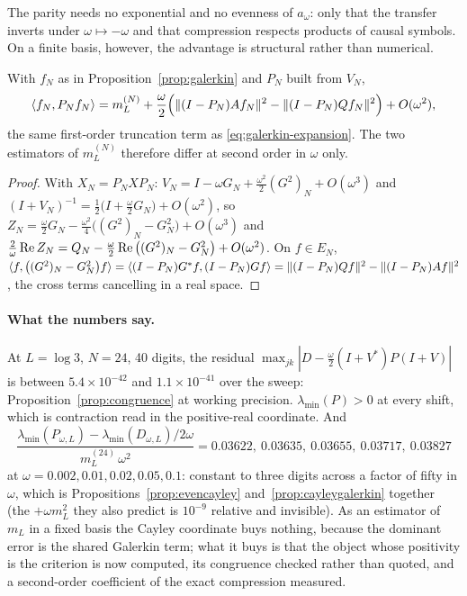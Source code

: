 The parity needs no exponential and no evenness of $a_\omega$: only that the
transfer inverts under $\omega\mapsto-\omega$ and that compression respects
products of causal symbols. On a finite basis, however, the advantage is
structural rather than numerical.

\begin{proposition}\label{prop:cayleygalerkin}
With $f_N$ as in Proposition~\ref{prop:galerkin} and $P_N$ built from $V_N$,
\begin{equation}\label{eq:cayley-galerkin}
 \langle f_N,P_Nf_N\rangle=m_L^{(N)}
 +\frac\omega2\Big(\lVert (I-P_N)Af_N\rVert^2-\lVert (I-P_N)Qf_N\rVert^2\Big)+O(\omega^2),
\end{equation}
the same first-order truncation term as \eqref{eq:galerkin-expansion}. The two
estimators of $m_L^{(N)}$ therefore differ at second order in $\omega$ only.
\end{proposition}
\begin{proof}
With $X_N=P_NXP_N$: $V_N=I-\omega G_N+\frac{\omega^2}2(G^2)_N+O(\omega^3)$ and
$(I+V_N)^{-1}=\frac12\big(I+\frac\omega2G_N\big)+O(\omega^2)$, so
$Z_N=\frac\omega2G_N-\frac{\omega^2}4\big((G^2)_N-G_N^2\big)+O(\omega^3)$ and
$\frac2\omega\operatorname{Re} Z_N=Q_N-\frac\omega2\operatorname{Re}\big((G^2)_N-G_N^2\big)+O(\omega^2)$.
On $f\in E_N$,
$\langle f,\big((G^2)_N-G_N^2\big)f\rangle=\langle (I-P_N)G^*f,(I-P_N)Gf\rangle
=\lVert (I-P_N)Qf\rVert^2-\lVert (I-P_N)Af\rVert^2$, the cross terms cancelling in a real
space.
\end{proof}

\paragraph{What the numbers say.} At $L=\log3$, $N=24$, 40 digits, the residual
$\max_{jk}|D-\frac\omega2(I+V^*)P(I+V)|$ is between $5.4\times10^{-42}$ and
$1.1\times10^{-41}$ over the sweep: Proposition~\ref{prop:congruence} at
working precision. $\lambda_{\min}(P)>0$ at every shift, which is contraction
read in the positive-real coordinate. And
\begin{equation}\label{eq:cayleygap}
 \frac{\lambda_{\min}(P_{\omega,L})-\lambda_{\min}(D_{\omega,L})/2\omega}{m_L^{(24)}\,\omega^2}
 =0.03622,\ 0.03635,\ 0.03655,\ 0.03717,\ 0.03827
\end{equation}
at $\omega=0.002,0.01,0.02,0.05,0.1$: constant to three digits across a factor
of fifty in $\omega$, which is Propositions~\ref{prop:evencayley}
and~\ref{prop:cayleygalerkin} together (the $+\omega m_L^2$ they also predict is
$10^{-9}$ relative and invisible). As an estimator of $m_L$ in a fixed basis the
Cayley coordinate buys nothing, because the dominant error is the shared
Galerkin term; what it buys is that the object whose positivity is the criterion
is now computed, its congruence checked rather than quoted, and a second-order
coefficient of the exact compression measured.

